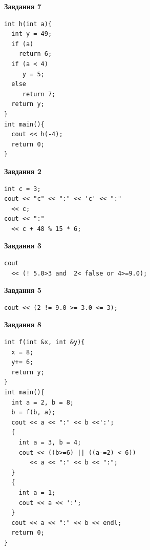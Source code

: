 \documentclass[12pt, ukrainian]{article}
\begin{document}
{\begin {large}
\begin{minipage}[t]{7.0cm}
\begin{center}
\textbf{Завдання 7}
\end{center}
\vspace{-8mm}

\begin{verbatim}
int h(int a){
  int y = 49;
  if (a)
    return 6;
  if (a < 4)
     y = 5;
  else
     return 7;
  return y;
}
int main(){
  cout << h(-4);
  return 0;
}
\end{verbatim}

\end{minipage}
\vline \hspace{1mm}
\begin{minipage}[t]{11.0cm}

\begin{center}
\textbf{Завдання 2}
\end{center}
\vspace{-8mm}

\begin{verbatim}
int c = 3;
cout << "c" << ":" << 'c' << ":" 
  << c;
cout << ":" 
  << c + 48 % 15 * 6;
\end{verbatim}



\begin{center}
\textbf{Завдання 3}
\end{center}
\vspace{-8mm}

\begin{verbatim}
cout 
  << (! 5.0>3 and  2< false or 4>=9.0);
\end{verbatim}



\begin{center}
\textbf{Завдання 5}
\end{center}
\vspace{-8mm}

\begin{verbatim}
cout << (2 != 9.0 >= 3.0 <= 3);
\end{verbatim}



\begin{center}
\textbf{Завдання 8}
\end{center}
\vspace{-8mm}

\begin{verbatim}
int f(int &x, int &y){
  x = 8;
  y+= 6;
  return y;
}
int main(){
  int a = 2, b = 8;
  b = f(b, a);
  cout << a << ":" << b <<':';
  {
    int a = 3, b = 4;
    cout << ((b>=6) || ((a-=2) < 6))
       << a << ":" << b << ":";
  }
  {
    int a = 1;
    cout << a << ':';
  }
  cout << a << ":" << b << endl;
  return 0;
}
\end{verbatim}


\end{minipage}
\end{large}}
\end{document}
